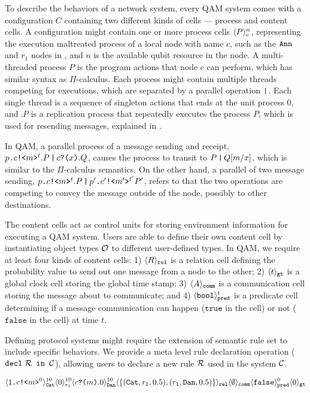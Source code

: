 To describe the behaviors of a network system, every QAM system comes with a configuration $C$
containing two different kinds of cells --- process and content cells.
A configuration might contain one or more process cells $\langle P \rangle^{n}_{c}$, representing the execution maltreated process of a local node with name $c$, such as the $\texttt{Ann}$ and $r_1$ nodes in ,
and $n$ is the available qubit resource in the node.
A multi-threaded process $P$ is the program actions that node $c$ can perform, which has similar syntax as $\Pi$-calculus.
Each process might contain multiple threads competing for executions, which are separated by a parallel operation $\texttt{|}$.
Each single thread is a sequence of singleton actions that ends at the unit process $0$,
and $\comp{P}$ is a replication process that repeatedly executes the process $P$, 
which is used for resending messages, explained in .

In QAM, a parallel process of a message sending and receipt, $p\texttt{.}c\texttt{!<}m\texttt{>}^t.P\,\texttt{|}\,c\texttt{?(}x\texttt{)}.Q$,
causes the process to transit to $P\,\texttt{|}\,Q[m/x]$, which is similar to the $\Pi$-calculus semantics.
On the other hand, a parallel of two message sending, $p\texttt{.}c\texttt{!<}m\texttt{>}^t.P\,\texttt{|}\,p'\texttt{.}c'\texttt{!<}m'\texttt{>}^{t'}{P'}$,
refers to that the two operations are competing to convey the message outside of the node, possibly to other destinations.

The content cells act as control units for storing environment information for executing a QAM system.
Users are able to define their own content cell by instantiating object types $\mathcal{O}$ to different user-defined types.
In QAM, we require at least four kinds of content cells: 
1) $\langle R \rangle_{\texttt{rel}}$ is a relation cell defining the probability value to send out one message from a node to the other;
2) $\langle t \rangle_{\texttt{gt}}$ is a global clock cell storing the global time stamp;
3) $\langle A \rangle_{\texttt{comm}}$ is a communication cell storing the message about to communicate;
and 4) $\langle \texttt{bool} \rangle^{t}_{\texttt{pred}}$ is a predicate cell 
determining if a message communication can happen ($\texttt{true}$ in the cell) or not ($\texttt{false}$ in the cell) at time $t$.

Defining protocol systems might require the extension of semantic rule set to include specific behaviors.
We provide a meta level rule declaration operation ($\texttt{decl}\;\mathcal{R}\texttt{ in }\mathcal{C}$), allowing users to declare a new rule $\mathcal{R}$ used in the system $\mathcal{C}$. 

{\footnotesize
\[
\langle 1\texttt{.}c\texttt{!<}m\texttt{>}^0 \rangle^{10}_{\texttt{Cat}}\langle 0 \rangle^{10}_{r_1}
\langle c\texttt{?(}m\texttt{)}.0 \rangle^{10}_{\texttt{Dan}} 
\langle \{(\texttt{Cat},r_1,0.5), (r_1,\texttt{Dan},0.5)\} \rangle_{\texttt{rel}}
\langle \emptyset \rangle_{\texttt{comm}}
\langle \texttt{false} \rangle^{0}_{\texttt{pred}}
\langle 0 \rangle_{\texttt{gt}}
\]
}

